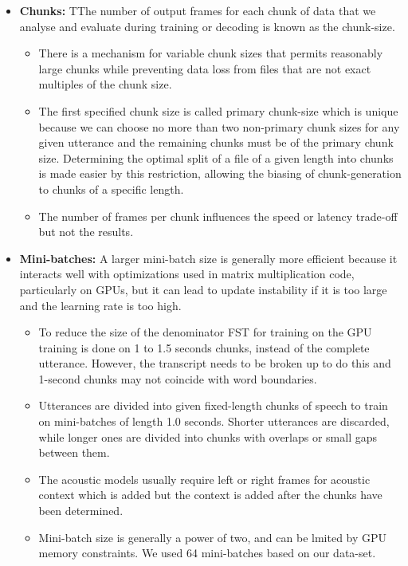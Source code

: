 \begin{itemize}
\begin{itemize}
    \end{itemize}
    \item \textbf{Chunks:} TThe number of output frames for each chunk of data that we analyse and evaluate during training or decoding is known as the chunk-size.
    \begin{itemize}
        \item There is a mechanism for variable chunk sizes that permits reasonably large chunks while preventing data loss from files that are not exact multiples of the chunk size. 
        \item The first specified chunk size is called primary chunk-size which is unique because we can choose no more than two non-primary chunk sizes for any given utterance and the remaining chunks must be of the primary chunk size. Determining the optimal split of a file of a given length into chunks is made easier by this restriction, allowing the biasing of chunk-generation to chunks of a specific length.
        \item The number of frames per chunk influences the speed or latency trade-off but not the results.
    \end{itemize}    
    \item \textbf{Mini-batches:} A larger mini-batch size is generally more efficient because it interacts well with optimizations used in matrix multiplication code, particularly on GPUs, but it can lead to update instability if it is too large and the learning rate is too high. %
    \begin{itemize}     
        \item To reduce the size of the denominator FST for training on the GPU training is done on 1 to 1.5 seconds chunks, instead of the complete utterance. However, the transcript needs to be broken up to do this and 1-second chunks may not coincide with word boundaries.
        \item Utterances are divided into given fixed-length chunks of speech to train on mini-batches of length 1.0 seconds. Shorter utterances are discarded, while longer ones are divided into chunks with overlaps or small gaps between them.
        \item The acoustic models usually require left or right frames for acoustic context which is added but the context is added after the chunks have been determined. 
        \item Mini-batch size is generally a power of two, and can be lmited by GPU memory constraints. We used 64 mini-batches based on our data-set. 

\end{itemize}
\end{itemize}
